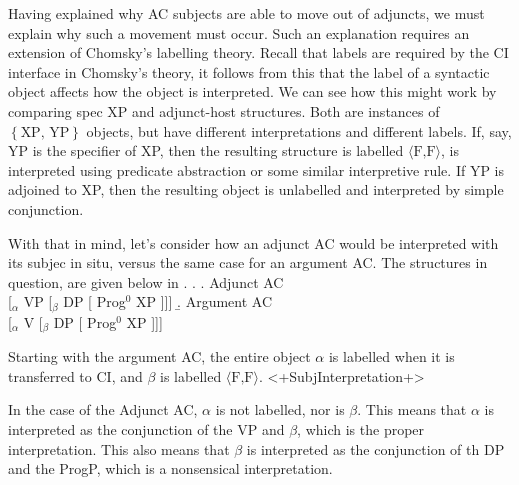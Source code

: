 \documentclass[letterpaper]{article}
\begin{document}
Having explained why AC subjects are able to move out of adjuncts, we must explain why such a movement must occur.
Such an explanation requires an extension of Chomsky's labelling theory.
Recall that labels are required by the CI interface in Chomsky's theory, it follows from this that the label of a syntactic object affects how the object is interpreted.
We can see how this might work by comparing spec XP and adjunct-host structures.
Both are instances of $\left\{ \text{XP, YP} \right\}$ objects, but have different interpretations and different labels.
If, say, YP is the specifier of XP, then the resulting structure is labelled $\langle\text{F,F}\rangle$, is interpreted using predicate abstraction or some similar interpretive rule.
If YP is adjoined to XP, then the resulting object is unlabelled and interpreted by simple conjunction.

With that in mind, let's consider how an adjunct AC would be interpreted with its subjec in situ, versus the same case for an argument AC.
The structures in question, are given below in \Next.
\ex.
\a. Adjunct AC\\
{[$_\alpha$ VP [$_\beta$ DP [ Prog$^0$ XP ]]]}
\b. Argument AC\\
{[$_\alpha$ V [$_\beta$ DP [ Prog$^0$ XP ]]]}

Starting with the argument AC, the entire object $\alpha$ is labelled when it is transferred to CI, and $\beta$ is labelled $\langle\text{F,F}\rangle$.
<+SubjInterpretation+>

In the case of the Adjunct AC, $\alpha$ is not labelled, nor is $\beta$.
This means that $\alpha$ is interpreted as the conjunction of the VP and $\beta$, which is the proper interpretation.
This also means that $\beta$ is interpreted as the conjunction of th DP and the ProgP, which is a nonsensical interpretation.
\end{document}
